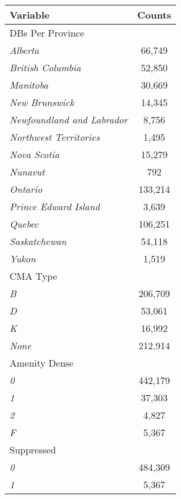 \documentclass[11pt, a4paper]{article}
\begin{document}
\pagestyle{empty}




\begin{longtable}{|l|c|}
\hline
\textbf{Variable}  & \textbf{Counts}  \\
\hline
{DBs Per Province} &  \\
\indent\indent \textit{Alberta} & 66,749 \\
\indent\indent \textit{British Columbia} & 52,850 \\
\indent\indent \textit{Manitoba} & 30,669 \\
\indent\indent \textit{New Brunswick} & 14,345 \\
\indent\indent \textit{Newfoundland and Labrador} & 8,756 \\
\indent\indent \textit{Northwest Territories} & 1,495 \\
\indent\indent \textit{Nova Scotia} & 15,279 \\
\indent\indent \textit{Nunavut} & 792 \\
\indent\indent \textit{Ontario} & 133,214 \\
\indent\indent \textit{Prince Edward Island} & 3,639 \\
\indent\indent \textit{Quebec} &  106,251 \\
\indent\indent \textit{Saskatchewan} & 54,118 \\
\indent\indent \textit{Yukon} & 1,519 \\
\hline

{CMA Type} &  \\
\indent\indent \textit{B} & 206,709 \\
\indent\indent \textit{D} & 53,061 \\
\indent\indent \textit{K} & 16,992 \\
\indent\indent \textit{None} & 212,914 \\
\hline

{Amenity Dense} &  \\
\indent\indent \textit{0} & 442,179 \\
\indent\indent \textit{1} & 37,303 \\
\indent\indent \textit{2} & 4,827 \\
\indent\indent \textit{F} & 5,367 \\
\hline

{Suppressed} &  \\
\indent\indent \textit{0} & 484,309 \\
\indent\indent \textit{1} & 5,367 \\
\hline

\hline
\end{longtable}
\end{document}
